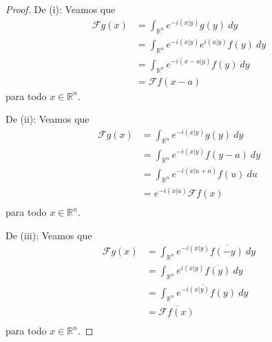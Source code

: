 \documentclass[12pt]{report}
\theoremstyle{largebreak}
\newcommand\pint[2]{\ensuremath{\left(#1\big| #2\right)}}
\newcommand\conj[1]{\ensuremath{\overline{#1}}}
\newcommand{\fou}[1]{\ensuremath{\mathcal{F}#1}}
\begin{document}
    \begin{proof}
        De (i): Veamos que
        \begin{equation*}
            \begin{split}
                \fou{g}(x)&=\int_{\mathbb{R}^n}e^{ -i\pint{x}{y}}g(y)\:dy\\
                &=\int_{\mathbb{R}^n}e^{ -i\pint{x}{y}}e^{ i\pint{a}{y}}f(y)\:dy\\
                &=\int_{\mathbb{R}^n}e^{ -i\pint{x-a}{y}}f(y)\:dy\\
                &=\fou{f}(x-a)
            \end{split}
        \end{equation*}
        para todo $x\in\mathbb{R}^n$.

        De (ii): Veamos que
        \begin{equation*}
            \begin{split}
                \fou{g}(x)&=\int_{\mathbb{R}^n}e^{ -i\pint{x}{y}}g(y)\:dy\\
                &=\int_{\mathbb{R}^n}e^{ -i\pint{x}{y}}f(y-a)\:dy\\
                &=\int_{\mathbb{R}^n}e^{ -i\pint{x}{u+a}}f(u)\:du\\
                &=e^{ -i\pint{x}{a}}\fou{f}(x) \\
            \end{split}
        \end{equation*}
        para todo $x\in\mathbb{R}^n$.

        De (iii): Veamos que
        \begin{equation*}
            \begin{split}
                \fou{g}(x)&=\int_{\mathbb{R}^n}e^{-i\pint{x}{y}}\conj{f(-y)}\:dy\\
                &=\int_{\mathbb{R}^n}e^{i\pint{x}{y}}\conj{f(y)}\:dy\\
                &=\conj{\int_{\mathbb{R}^n}e^{-i\pint{x}{y}}f(y)\:dy}\\
                &=\conj{\fou{f}(x)}\\
            \end{split}
        \end{equation*}
        para todo $x\in\mathbb{R}^n$.
        

\end{proof}
\end{document}
